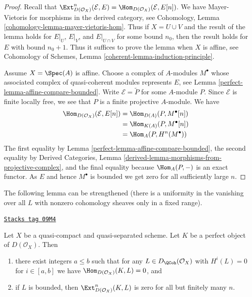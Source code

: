 \begin{proof}

Recall that $\Ext^n_{D(\mathcal{O}_X)}(\mathcal{E}, E) =
\Hom_{D(\mathcal{O}_X)}(\mathcal{E}, E[n])$. We have
Mayer-Vietoris for morphisms in the derived category, see
Cohomology, Lemma \ref{cohomology-lemma-mayer-vietoris-hom}.
Thus if $X = U \cup V$ and the result of the lemma holds
for $E|_U$, $E|_V$, and $E|_{U \cap V}$ for some bound $n_0$,
then the result holds for $E$ with bound $n_0 + 1$.
Thus it suffices to prove the lemma when $X$ is affine, see
Cohomology of Schemes, Lemma \ref{coherent-lemma-induction-principle}.

\medskip\noindent
Assume $X = \Spec(A)$ is affine. Choose a complex of $A$-modules
$M^\bullet$ whose associated complex of quasi-coherent modules
represents $E$, see Lemma \ref{perfect-lemma-affine-compare-bounded}.
Write $\mathcal{E} = \widetilde{P}$ for some $A$-module $P$.
Since $\mathcal{E}$ is finite locally free, we see that $P$
is a finite projective $A$-module. We have
\begin{align*}
\Hom_{D(\mathcal{O}_X)}(\mathcal{E}, E[n])
& =
\Hom_{D(A)}(P, M^\bullet[n]) \\
& =
\Hom_{K(A)}(P, M^\bullet[n]) \\
& =
\Hom_A(P, H^n(M^\bullet))
\end{align*}
The first equality by Lemma \ref{perfect-lemma-affine-compare-bounded},
the second equality by
Derived Categories, Lemma
\ref{derived-lemma-morphisms-from-projective-complex}, and
the final equality because $\Hom_A(P, -)$ is an exact functor.
As $E$ and hence $M^\bullet$ is bounded
we get zero for all sufficiently large $n$.
\end{proof}

The following lemma can be strengthened (there is a uniformity
in the vanishing over all $L$ with nonzero cohomology sheaves
only in a fixed range).

\begin{lemma}
\label{perfect-lemma-ext-from-perfect-into-bounded-QCoh}
\href{https://stacks.math.columbia.edu/tag/09M4}{\texttt{Stacks tag 09M4}}

Let $X$ be a quasi-compact and quasi-separated scheme.
Let $K$ be a perfect object of $D(\mathcal{O}_X)$. Then
\begin{enumerate}
\item there exist integers $a \leq b$ such that for any
$L \in D_\QCoh(\mathcal{O}_X)$ with $H^i(L) = 0$ for $i \in [a, b]$
we have $\Hom_{D(\mathcal{O}_X)}(K, L) = 0$, and
\item if $L$ is bounded, then $\Ext^n_{D(\mathcal{O}_X)}(K, L)$
is zero for all but finitely many $n$.
\end{enumerate}
\end{lemma}

